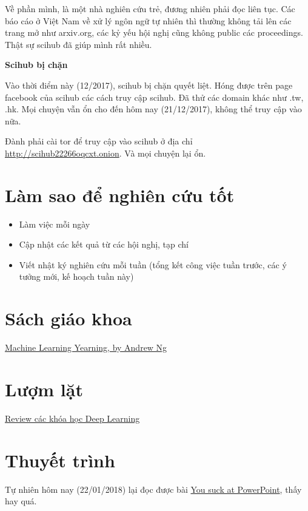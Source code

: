 Về phần mình, là một nhà nghiên cứu trẻ, đương nhiên phải đọc liên tục. Các báo cáo ở Việt Nam về xử lý ngôn ngữ tự nhiên thì thường không tải lên các trang mở như arxiv.org, các kỷ yếu hội nghị cũng không public các proceedings. Thật sự scihub đã giúp mình rất nhiều.

\textbf{Scihub bị chặn}

Vào thời điểm này (12/2017), scihub bị chặn quyết liệt. Hóng được trên page facebook của scihub các cách truy cập scihub. Đã thử các domain khác như .tw, .hk. Mọi chuyện vẫn ổn cho đến hôm nay (21/12/2017), không thể truy cập vào nữa.

Đành phải cài tor để truy cập vào scihub ở địa chỉ \href{http://scihub22266oqcxt.onion/https://dl.acm.org/citation.cfm?id=1852627}{http://scihub22266oqcxt.onion}. Và mọi chuyện lại ổn.

\section{Làm sao để nghiên cứu tốt}

\begin{itemize}
  \item Làm việc mỗi ngày
  \item Cập nhật các kết quả từ các hội nghị, tạp chí
  \item Viết nhật ký nghiên cứu mỗi tuần (tổng kết công việc tuần trước, các ý tưởng mới, kế hoạch tuần này)
\end{itemize}

\section{Sách giáo khoa}

\href{https://gallery.mailchimp.com/dc3a7ef4d750c0abfc19202a3/files/Machine_Learning_Yearning_V0.5_01.pdf}{Machine Learning Yearning, by Andrew Ng}

\section{Lượm lặt}

\href{https://www.kdnuggets.com/2017/10/3-popular-courses-deep-learning.html}{Review các khóa học Deep Learning}

\section{Thuyết trình}

Tự nhiên hôm nay (22/01/2018) lại đọc được bài \href{https://huynq.net/you-suck-at-powerpoint/}{You suck at PowerPoint}, thấy hay quá.

